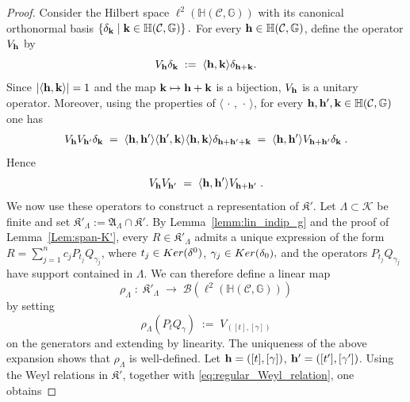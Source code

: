 \documentclass[10pt,a4paper]{amsart}
\newcommand{\ab}[1]{\left| #1 \right|}
\newcommand{\f}[1]{\mathcal{#1}}
\newcommand{\n}[1]{\mathbb{#1}}
\newcommand{\pa}[1]{\left( #1 \right)}
\begin{document}
	\begin{proof}
		Consider the Hilbert space
		$
		\ell^2\pa{\n{H}(\f{C},\n{G})}
		$
		with its canonical orthonormal basis
		$
		\left\{\delta_{\bf k}\;\middle|\;{\bf k}\in\n{H}(\f{C},\n{G})\right\}.
		$
		For every ${\bf h}\in\n{H}(\f{C},\n{G})$, define the operator $V_{\bf h}$ by
		\begin{equation}\label{eq:regular_representation_H}
			V_{\bf h}\delta_{\bf k}\;:=\;\langle{\bf h},{\bf k}\rangle \delta_{{\bf h}+{\bf k}}.
		\end{equation}
		Since $\ab{\langle{\bf h},{\bf k}\rangle}=1$ and the map ${\bf k}\mapsto{\bf h}+{\bf k}$ is a bijection, $V_{\bf h}$ is a unitary operator.
		Moreover, using the properties of $\langle\,\cdot\,,\,\cdot\,\rangle$, for every ${\bf h},{\bf h}',{\bf k}\in\n{H}(\f{C},\n{G})$ one has
		\begin{align*}
			V_{\bf h}V_{{\bf h}'}\delta_{\bf k}\;=\;\langle{\bf h},{\bf h}'\rangle\langle{\bf h}',{\bf k}\rangle\langle{\bf h},{\bf k}\rangle\delta_{{\bf h}+{\bf h}'+{\bf k}}\;=\;\langle{\bf h},{\bf h}'\rangle V_{{\bf h}+{\bf h}'}\delta_{\bf k}\;.
		\end{align*}
		Hence
		\begin{equation}\label{eq:regular_Weyl_relation}
			V_{\bf h}V_{{\bf h}'}\;=\;\langle{\bf h},{\bf h}'\rangle V_{{\bf h}+{\bf h}'}\;.
		\end{equation}
		We now use these operators to construct a representation of $\mathfrak{K}'$. Let $\Lambda\subset\f{K}$ be finite and set
		$
		\mathfrak{K}'_\Lambda:=\mathfrak{A}_\Lambda\cap\mathfrak{K}'.
		$
		By Lemma~\ref{lemm:lin_indip_g} and the proof of Lemma~\ref{Lem:span-K'}, every $R\in\mathfrak{K}'_\Lambda$ admits a unique expression of the form
		$
		R=\sum_{j=1}^n c_j P_{t_j}Q_{\gamma_j}
		$,
		where
		$
		t_j\in{\rm Ker}(\delta^0)$, $\gamma_j\in{\rm Ker}(\delta_0),
		$
		and the operators $P_{t_j}Q_{\gamma_j}$ have support contained in $\Lambda$.
		We can therefore define a linear map
		\[
		\rho_\Lambda\;:\; \mathfrak{K}'_\Lambda\;\longrightarrow\;\mathcal{B}\pa{\ell^2\pa{\n{H}(\f{C},\n{G})}}
		\]
		by setting
		\begin{equation}\label{eq:rho_local_definition}
			\rho_\Lambda(P_tQ_\gamma)\;:=\;V_{([t],[\gamma])}
		\end{equation}
		on the generators and extending by linearity. The uniqueness of the above expansion shows that $\rho_\Lambda$ is well-defined.
		Let
		$
		{\bf h}=([t],[\gamma])$, ${\bf h}'=([t'],[\gamma'])
		$.
		Using the Weyl relations in $\mathfrak{K}'$, together with \eqref{eq:regular_Weyl_relation}, one obtains

\end{proof}
\end{document}
